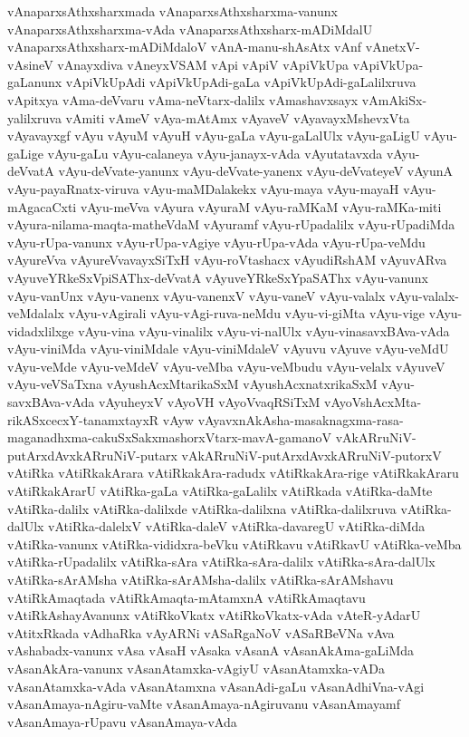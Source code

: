 {vAnaparxsAthxsharxmada
vAnaparxsAthxsharxma-vanunx
vAnaparxsAthxsharxma-vAda
vAnaparxsAthxsharx-mADiMdalU
vAnaparxsAthxsharx-mADiMdaloV
vAnA-manu-shAsAtx
vAnf
vAnetxV-vAsineV
vAnayxdiva
vAneyxVSAM
vApi
vApiV
vApiVkUpa
vApiVkUpa-gaLanunx
vApiVkUpAdi
vApiVkUpAdi-gaLa
vApiVkUpAdi-gaLalilxruva
vApitxya
vAma-deVvaru
vAma-neVtarx-dalilx
vAmashavxsayx
vAmAkiSx-yalilxruva
vAmiti
vAmeV
vAya-mAtAmx
vAyaveV
vAyavayxMshevxVta
vAyavayxgf
vAyu
vAyuM
vAyuH
vAyu-gaLa
vAyu-gaLalUlx
vAyu-gaLigU
vAyu-gaLige
vAyu-gaLu
vAyu-calaneya
vAyu-janayx-vAda
vAyutatavxda
vAyu-deVvatA
vAyu-deVvate-yanunx
vAyu-deVvate-yanenx
vAyu-deVvateyeV
vAyunA
vAyu-payaRnatx-viruva
vAyu-maMDalakekx
vAyu-maya
vAyu-mayaH
vAyu-mAgacaCxti
vAyu-meVva
vAyura
vAyuraM
vAyu-raMKaM
vAyu-raMKa-miti
vAyura-nilama-maqta-matheVdaM
vAyuramf
vAyu-rUpadalilx
vAyu-rUpadiMda
vAyu-rUpa-vanunx
vAyu-rUpa-vAgiye
vAyu-rUpa-vAda
vAyu-rUpa-veMdu
vAyureVva
vAyureVvavayxSiTxH
vAyu-roVtashacx
vAyudiRshAM
vAyuvARva
vAyuveYRkeSxVpiSAThx-deVvatA
vAyuveYRkeSxYpaSAThx
vAyu-vanunx
vAyu-vanUnx
vAyu-vanenx
vAyu-vanenxV
vAyu-vaneV
vAyu-valalx
vAyu-valalx-veMdalalx
vAyu-vAgirali
vAyu-vAgi-ruva-neMdu
vAyu-vi-giMta
vAyu-vige
vAyu-vidadxlilxge
vAyu-vina
vAyu-vinalilx
vAyu-vi-nalUlx
vAyu-vinasavxBAva-vAda
vAyu-viniMda
vAyu-viniMdale
vAyu-viniMdaleV
vAyuvu
vAyuve
vAyu-veMdU
vAyu-veMde
vAyu-veMdeV
vAyu-veMba
vAyu-veMbudu
vAyu-velalx
vAyuveV
vAyu-veVSaTxna
vAyushAcxMtarikaSxM
vAyushAcxnatxrikaSxM
vAyu-savxBAva-vAda
vAyuheyxV
vAyoVH
vAyoVvaqRSiTxM
vAyoVshAcxMta-rikASxcecxY-tanamxtayxR
vAyw
vAyavxnAkAsha-masaknagxma-rasa-maganadhxma-cakuSxSakxmashorxVtarx-mavA-gamanoV
vAkARruNiV-putArxdAvxkARruNiV-putarx
vAkARruNiV-putArxdAvxkARruNiV-putorxV
vAtiRka
vAtiRkakArara
vAtiRkakAra-radudx
vAtiRkakAra-rige
vAtiRkakAraru
vAtiRkakArarU
vAtiRka-gaLa
vAtiRka-gaLalilx
vAtiRkada
vAtiRka-daMte
vAtiRka-dalilx
vAtiRka-dalilxde
vAtiRka-dalilxna
vAtiRka-dalilxruva
vAtiRka-dalUlx
vAtiRka-dalelxV
vAtiRka-daleV
vAtiRka-davaregU
vAtiRka-diMda
vAtiRka-vanunx
vAtiRka-vididxra-beVku
vAtiRkavu
vAtiRkavU
vAtiRka-veMba
vAtiRka-rUpadalilx
vAtiRka-sAra
vAtiRka-sAra-dalilx
vAtiRka-sAra-dalUlx
vAtiRka-sArAMsha
vAtiRka-sArAMsha-dalilx
vAtiRka-sArAMshavu
vAtiRkAmaqtada
vAtiRkAmaqta-mAtamxnA
vAtiRkAmaqtavu
vAtiRkAshayAvanunx
vAtiRkoVkatx
vAtiRkoVkatx-vAda
vAteR-yAdarU
vAtitxRkada
vAdhaRka
vAyARNi
vASaRgaNoV
vASaRBeVNa
vAva
vAshabadx-vanunx
vAsa
vAsaH
vAsaka
vAsanA
vAsanAkAma-gaLiMda
vAsanAkAra-vanunx
vAsanAtamxka-vAgiyU
vAsanAtamxka-vADa
vAsanAtamxka-vAda
vAsanAtamxna
vAsanAdi-gaLu
vAsanAdhiVna-vAgi
vAsanAmaya-nAgiru-vaMte
vAsanAmaya-nAgiruvanu
vAsanAmayamf
vAsanAmaya-rUpavu
vAsanAmaya-vAda
}
